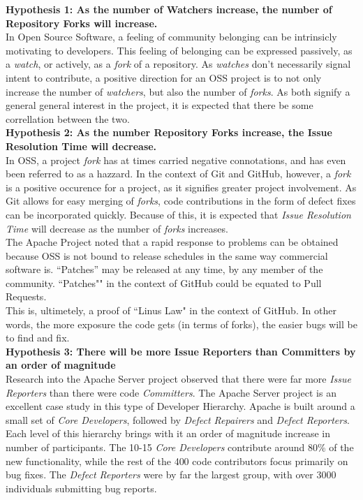 \documentclass{proc}
\begin{document}
\textbf{Hypothesis 1: As the number of Watchers increase, the number of Repository Forks will increase.}\\
In Open Source Software, a feeling of community belonging can be intrinsicly motivating to developers\cite{lakhani2003hackers}. This feeling of belonging can be expressed passively, as a \emph{watch}, or actively, as a \emph{fork} of a repository. As \emph{watches} don't necessarily signal intent to contribute, a positive direction for an OSS project is to not only increase the number of \emph{watchers}, but also the number of \emph{forks}. As both signify a general general interest in the project, it is expected that there be some correllation between the two.\\

\textbf{Hypothesis 2: As the number Repository Forks increase, the Issue Resolution Time will decrease.}\\
In OSS, a project \emph{fork} has at times carried negative connotations, and has even been referred to as a hazzard\cite{kogut2001open}. In the context of Git and GitHub, however, a \emph{fork} is a positive occurence for a project, as it signifies greater project involvement. As Git allows for easy merging of \emph{forks}, code contributions in the form of defect fixes can be incorporated quickly. Because of this, it is expected that \emph{Issue Resolution Time} will decrease as the number of \emph{forks} increases.\\

The Apache Project noted that a rapid response to problems can be obtained because OSS is not bound to release schedules in the same way commercial software is. ``Patches'' may be released at any time, by any member of the community\cite{mockus2000case}. ``Patches"" in the context of GitHub could be equated to Pull Requests.\\

This is, ultimetely, a proof of ``Linus Law"\cite{raymond1999cathedral} in the context of GitHub. In other words, the more exposure the code gets (in terms of forks), the easier bugs will be to find and fix.\\

\textbf{Hypothesis 3: There will be more Issue Reporters than Committers by an order of magnitude}\\
Research into the Apache Server project observed that there were far more \emph{Issue Reporters} than there were code \emph{Committers}\cite{mockus2000case}. The Apache Server project is an excellent case study in this type of Developer Hierarchy. Apache is built around a small set of {\it Core Developers}, followed by {\it Defect Repairers} and {\it Defect Reporters}. Each level of this hierarchy brings with it an order of magnitude increase in number of participants. The 10-15 {\it Core Developers} contribute around 80\% of the new functionality, while the rest of the 400 code contributors focus primarily on bug fixes. The {\it Defect Reporters} were by far the largest group, with over 3000 individuals submitting bug reports.\\
\end{document}
